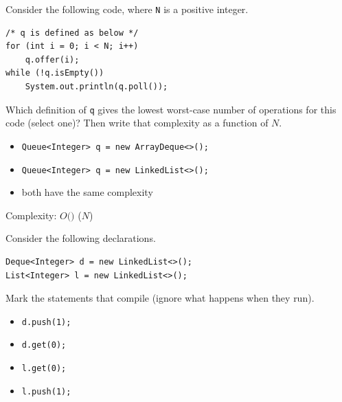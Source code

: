 \begin{question}
Consider the following code, where \lstinline|N| is a positive integer.

\begin{lstlisting}
/* q is defined as below */
for (int i = 0; i < N; i++)
    q.offer(i);
while (!q.isEmpty())
    System.out.println(q.poll());
\end{lstlisting}

Which definition of \lstinline|q| gives the lowest worst-case number of operations for this code (select one)? Then write that complexity as a function of $N$.

\begin{itemize}[leftmargin=2em,itemsep=1pt,topsep=2pt]
\item[\cb{0}] \lstinline|Queue<Integer> q = new ArrayDeque<>();|
\item[\cb{0}] \lstinline|Queue<Integer> q = new LinkedList<>();|
\item[\cb{1}] both have the same complexity
\end{itemize}

Complexity: $O($\underline{\hspace{1in}}$)$ \ifanswers ($N$)\fi
\end{question}

\begin{question}
Consider the following declarations.

\begin{lstlisting}
Deque<Integer> d = new LinkedList<>();
List<Integer> l = new LinkedList<>();
\end{lstlisting}

Mark the statements that compile (ignore what happens when they run).
\begin{itemize}[leftmargin=2em,itemsep=1pt,topsep=2pt]
\item[\cb{1}] \lstinline|d.push(1);|
\item[\cb{0}] \lstinline|d.get(0);|
\item[\cb{1}] \lstinline|l.get(0);|
\item[\cb{0}] \lstinline|l.push(1);|
\end{itemize}
\end{question}

